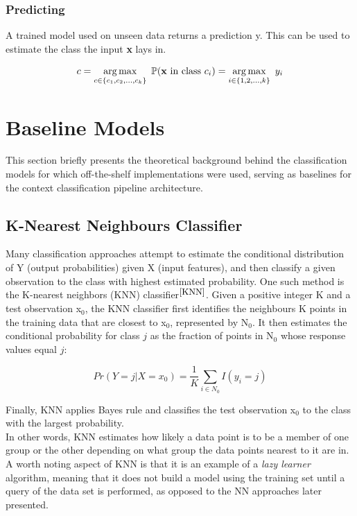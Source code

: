 \subsubsection*{Predicting}

A trained model used on unseen data returns a prediction y. This can be used to estimate the class the input \textbf{x} lays in.

\begin{equation}
  c = \operatorname*{arg\,max}_{c \in \{ c_1, c_2, ..., c_k\}} \ \mathbb{P}(\mathbf{x} \ \text{in class} \ c_i) = \operatorname*{arg\,max}_{i \in \{ 1, 2, ..., k\}} \ y_i
\end{equation}

\smallskip

\section{Baseline Models}

This section briefly presents the theoretical background behind the classification models for which off-the-shelf implementations were used, serving as baselines for the context classification pipeline architecture. 

\subsection{K-Nearest Neighbours Classifier}
Many classification approaches attempt to estimate the conditional distribution of Y (output probabilities) given X (input features), and then classify a given observation to the class with highest estimated probability. One such method is the K-nearest neighbors (KNN) classifier$^{\small \cite{KNN}}$. Given a positive integer K and a test observation x$_0$, the KNN classifier first identifies the neighbours K points in the training data that are closest to x$_0$, represented by N$_0$. It then estimates the conditional probability for class $j$ as the fraction of points in N$_0$ whose response values equal $j$:

\begin{equation}
    Pr(Y = j|X = x_0) = \frac{1}{K} \sum_{i \in N_0} I(y_i = j)
\end{equation}

Finally, KNN applies Bayes rule and classifies the test observation x$_0$ to
the class with the largest probability. \\

In other words, KNN estimates how likely a data point is to be a member of one group or the other depending on what group the data points nearest to it are in. A worth noting aspect of KNN is that it is an example of a \textit{lazy learner} algorithm, meaning that it does not build a model using the training set until a query of the data set is performed, as opposed to the NN approaches later presented. \\




